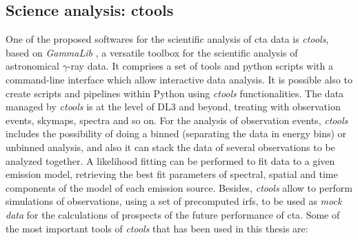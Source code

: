 \documentclass[main.tex]{subfiles}
\begin{document}
\subsection{Science analysis: ctools}

One of the proposed softwares for the scientific analysis of \gls{cta} data is \textit{ctools}, based on \textit{GammaLib} \cite{2016ctools}, a versatile toolbox for the scientific analysis of astronomical $\gamma$-ray data. It comprises a set of tools and python scripts with a command-line interface which allow interactive data analysis. It is possible also to create scripts and pipelines within Python using \textit{ctools} functionalities. The data managed by \textit{ctools} is at the level of DL3 and beyond, treating with observation events, skymaps, spectra and so on. For the analysis of observation events, \textit{ctools} includes the possibility of doing a binned (separating the data in energy bins) or unbinned analysis, and also it can stack the data of several observations to be analyzed together. A likelihood fitting can be performed to fit data to a given emission model, retrieving the best fit parameters of spectral, spatial and time components of the model of each emission source. Besides, \textit{ctools} allow to perform simulations of observations, using a set of precomputed \glspl{irf}, to be used as \textit{mock data} for the calculations of prospects of the future performance of \gls{cta}. Some of the most important tools of \textit{ctools} that has been used in this thesis are: \\
\end{document}
